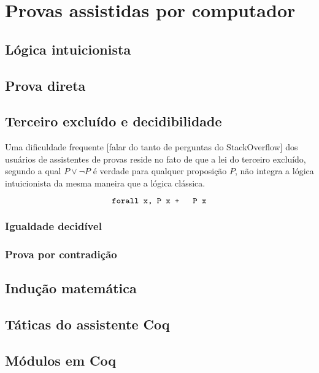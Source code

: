 \chapter{Provas assistidas por computador}
\label{cap:coq}

\section{Lógica intuicionista}

\section{Prova direta}

\section{Terceiro excluído e decidibilidade}

Uma dificuldade frequente [falar do tanto de perguntas do StackOverflow] dos usuários de assistentes de provas reside no fato de que a lei do terceiro excluído, segundo a qual $P \vee \neg P$ é verdade para qualquer proposição $P$, não integra a lógica intuicionista da mesma maneira que a lógica clássica.

$$\text{\texttt{forall x, {P x} + {~ P x}}}$$

\subsection{Igualdade decidível}
\label{ssec:eq_decidivel}

\subsection{Prova por contradição}

\section{Indução matemática}

\section{Táticas do assistente Coq}

\section{Módulos em Coq}
